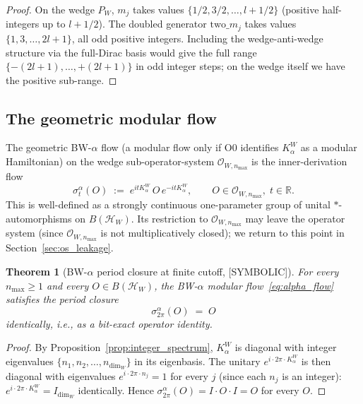 \documentclass[11pt,a4paper]{article}
\theoremstyle{plain}
\newtheorem{theorem}{Theorem}[section]
\theoremstyle{definition}
\newcommand{\nmax}{n_{\max}}
\newcommand{\Hilb}{\mathcal{H}}
\newcommand{\Op}{\mathcal{O}}
\newcommand{\R}{\mathbb{R}}
\begin{document}
\begin{proof}
On the wedge $P_W$, $m_j$ takes values $\{1/2, 3/2, \ldots, l + 1/2\}$
(positive half-integers up to $l + 1/2$). The doubled generator
$\mathrm{two}\_m_j$ takes values $\{1, 3, \ldots, 2l + 1\}$, all odd
positive integers. Including the wedge-anti-wedge structure via the
full-Dirac basis would give the full range $\{-(2l+1), \ldots, +(2l+1)\}$
in odd integer steps; on the wedge itself we have the positive
sub-range.
\end{proof}

\subsection{The geometric modular flow}\label{sec:alpha_flow}

The geometric BW-$\alpha$ flow (a modular flow only if O0 identifies
$K_\alpha^W$ as a modular Hamiltonian) on the wedge sub-operator-system
$\Op_{W, \nmax}$ is the inner-derivation flow
\begin{equation}\label{eq:alpha_flow}
   \sigma_t^{\alpha}(O)
   \;:=\; e^{i t K_\alpha^W}\, O\, e^{-i t K_\alpha^W},
   \qquad O \in \Op_{W, \nmax},\; t \in \R.
\end{equation}
This is well-defined as a strongly continuous one-parameter group of
unital $*$-automorphisms on $B(\Hilb_W)$. Its restriction to
$\Op_{W, \nmax}$ may leave the operator system (since $\Op_{W, \nmax}$
is not multiplicatively closed); we return to this point in
Section~\ref{sec:os_leakage}.

\begin{theorem}[BW-$\alpha$ period closure at finite cutoff, {[SYMBOLIC]}]
\label{thm:bw_alpha}
For every $\nmax \ge 1$ and every $O \in B(\Hilb_W)$, the BW-$\alpha$
modular flow~\eqref{eq:alpha_flow} satisfies the period closure
\begin{equation}\label{eq:bw_alpha_closure}
   \sigma_{2\pi}^{\alpha}(O) \;=\; O
\end{equation}
identically, i.e., as a bit-exact operator identity.
\end{theorem}

\begin{proof}
By Proposition~\ref{prop:integer_spectrum}, $K_\alpha^W$ is diagonal
with integer eigenvalues $\{n_1, n_2, \ldots, n_{\dim_W}\}$ in its
eigenbasis. The unitary $e^{i \cdot 2\pi \cdot K_\alpha^W}$ is then
diagonal with eigenvalues $e^{i \cdot 2\pi \cdot n_j} = 1$ for every
$j$ (since each $n_j$ is an integer):\
$e^{i \cdot 2\pi \cdot K_\alpha^W} = I_{\dim_W}$ identically. Hence
$\sigma_{2\pi}^{\alpha}(O) = I \cdot O \cdot I = O$ for every $O$.
\end{proof}
\end{document}
